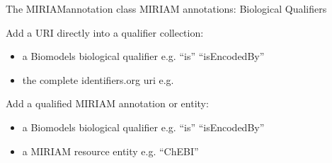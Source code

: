 \documentclass[letterpaper,10pt,english]{sphinxmanual}
\begin{document}
\begin{fulllineitems}
\label{\detokenize{modules_doc:cbmpy.CBCommon.MIRIAMannotation}}
\pysigstartsignatures
{}
\pysigstopsignatures
\sphinxAtStartPar
The MIRIAMannotation class MIRIAM annotations: Biological Qualifiers

\begin{fulllineitems}
\label{\detokenize{modules_doc:cbmpy.CBCommon.MIRIAMannotation.addIDorgURI}}
\pysigstartsignatures
{}
\pysigstopsignatures
\sphinxAtStartPar
Add a URI directly into a qualifier collection:
\begin{itemize}
\item {} 
\sphinxAtStartPar
{} a Biomodels biological qualifier e.g. “is” “isEncodedBy”

\item {} 
\sphinxAtStartPar
{} the complete identifiers.org uri e.g. 

\end{itemize}

\end{fulllineitems}


\begin{fulllineitems}
\label{\detokenize{modules_doc:cbmpy.CBCommon.MIRIAMannotation.addMIRIAMannotation}}
\pysigstartsignatures
{}
\pysigstopsignatures
\sphinxAtStartPar
Add a qualified MIRIAM annotation or entity:
\begin{itemize}
\item {} 
\sphinxAtStartPar
{} a Biomodels biological qualifier e.g. “is” “isEncodedBy”

\item {} 
\sphinxAtStartPar
{} a MIRIAM resource entity e.g. “ChEBI”


\end{itemize}
\end{fulllineitems}
\end{fulllineitems}
\end{document}
